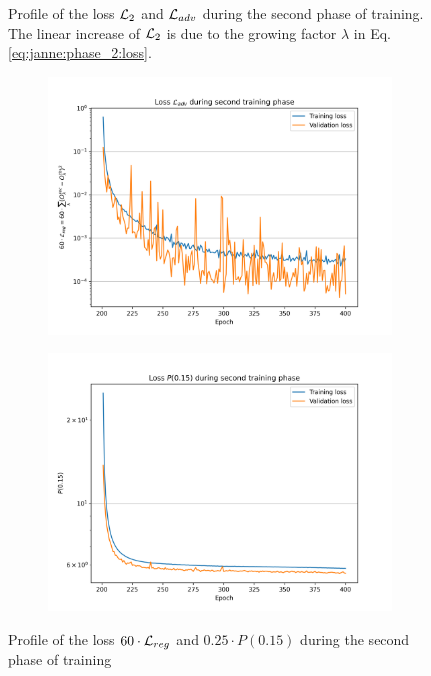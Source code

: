 \documentclass[../main.tex]{subfiles}
\begin{document}
\begin{figure}
\begin{subfigure}[t]{0.48\linewidth}
  \end{subfigure}
  \caption{Profile of the loss ${\cal L}_2$ and ${\cal L}_{adv}$ during the second phase of training. The linear increase of ${\cal L}_2$ is due to the growing factor $\lambda$ in Eq. \ref{eq:janne:phase_2:loss}.}
  \label{fig:janne:phase_2_1}
\end{figure}

\begin{figure}
  \centering
  \begin{subfigure}[t]{0.48\linewidth}
    \includegraphics[width=\linewidth]{images/janne/training/phase_2_loss_reg.png}
  \end{subfigure}
  \hfill
  \begin{subfigure}[t]{0.48\linewidth}
    \includegraphics[width=\linewidth]{images/janne/training/phase_2_penal.png}
  \end{subfigure}
  \caption{Profile of the loss $60 \cdot {\cal L}_{reg}$ and $0.25 \cdot P(0.15)$ during the second phase of training}
  \label{fig:janne:phase_2_2}
\end{figure}
\end{document}
